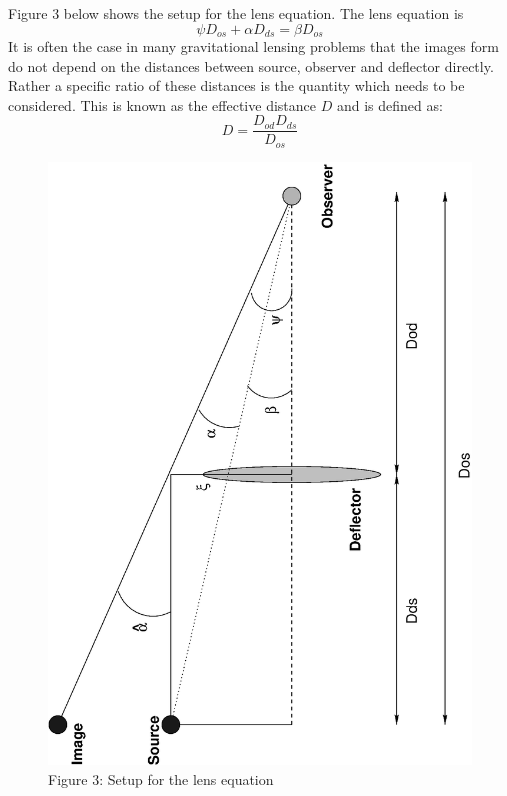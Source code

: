 \documentclass[a4paper]{IEEEtran}
\begin{document}
Figure 3 below shows the setup for the lens equation. The lens
equation is
\begin{equation}
    \psi D_{os} + \alpha D_{ds} = \beta D_{os}
\end{equation}
It is often the case in many gravitational lensing problems that 
the images form do not depend on the distances between source, observer
and deflector directly. Rather a specific ratio of these distances
is the quantity which needs to be considered. This is known as the
effective distance $D$ and is defined as:
\begin{equation}
\label{eq:effd}
    D = \frac{D_{od} D_{ds} }{D_{os}}
\end{equation}

\begin{figure}
    \label{fig:lens-equation}
    \caption{Figure 3: Setup for the lens equation} 
    \begin{center}
        \includegraphics[angle=-90,width=\columnwidth]{images/setup.eps}
    \end{center}
\end{figure} 
\end{document}
